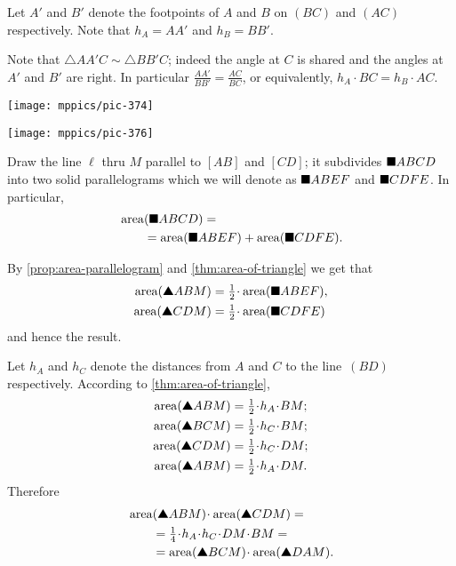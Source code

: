 Let $A'$ and $B'$ denote the footpoints of $A$ and $B$ on $(BC)$ and $(AC)$ respectively.
Note that $h_A=AA'$ and $h_B=BB'$.

Note that $\triangle AA'C\sim \triangle BB'C$;
indeed the angle at $C$ is shared and the angles at $A'$ and $B'$ are right.
In particular
$\frac{AA'}{BB'}=\frac{AC}{BC}$,
or equivalently, $h_A\cdot BC=h_B\cdot AC$.

\begin{Figure}
\vskip-0mm
\begin{minipage}{.49\textwidth}
\centering
\texttt{[image: mppics/pic-374]}
\end{minipage}
\hfill
\begin{minipage}{.49\textwidth}
\centering
\texttt{[image: mppics/pic-376]}
\end{minipage}
\end{Figure}

Draw the line $\ell$ 
thru $M$ parallel to $[AB]$ and $[CD]$;
it subdivides $\blacksquare ABCD$ into two solid parallelograms
which we will denote as
$\blacksquare ABEF$ and
$\blacksquare CDFE$.
In particular,
\begin{align*}
&\mathop{\rm area}\nolimits(\blacksquare ABCD)=
\\
&\qquad=
\mathop{\rm area}\nolimits(\blacksquare ABEF)+\mathop{\rm area}\nolimits(\blacksquare CDFE).
\end{align*}

By \ref{prop:area-parallelogram} and \ref{thm:area-of-triangle} we get that 
\begin{align*}
\area(\solidtriangle ABM)&=\tfrac12\cdot\area(\solidsquare ABEF),
\\
\area(\solidtriangle CDM)&=\tfrac12\cdot\area(\solidsquare CDFE)
\end{align*}
and hence the result.

Let $h_A$ and $h_C$ denote the distances from $A$ and $C$ to the line~$(BD)$ respectively.
According to \ref{thm:area-of-triangle},
\begin{align*}
\area(\solidtriangle ABM)&=\tfrac12\cdot h_A\cdot BM;
\\
\area(\solidtriangle BCM)&=\tfrac12\cdot h_C\cdot BM;
\\
\area(\solidtriangle CDM)&=\tfrac12\cdot h_C\cdot DM;
\\
\area(\solidtriangle ABM)&=\tfrac12\cdot h_A\cdot DM.
\end{align*}
Therefore
\begin{align*}
&\area(\solidtriangle ABM)\cdot \area(\solidtriangle CDM)=
\\
&\qquad=\tfrac14 \cdot h_A\cdot h_C\cdot DM\cdot BM=
\\
&\qquad=\area(\solidtriangle BCM)\cdot \area(\solidtriangle DAM).
\end{align*}

